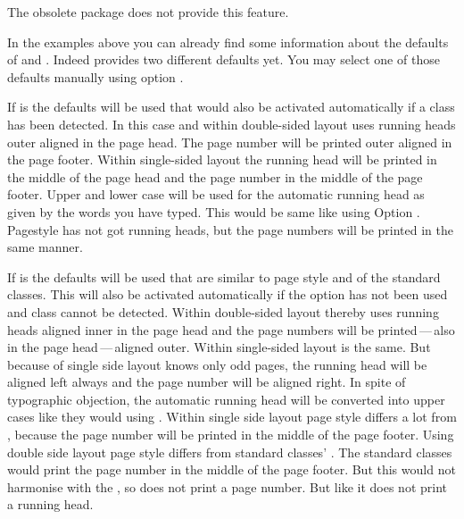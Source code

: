 The obsolete package  does not
provide this feature.%
%
\EndIndexGroup


\begin{Declaration}
\end{Declaration}
%
In the examples above you can already find some information about the defaults
of  and
. Indeed
 provides two different defaults yet. You may select
one of those defaults manually using option .

If  is  the defaults will be used that
would also be activated automatically if a \KOMAScript{} class has been
detected. In this case and within double-sided layout 
uses running heads outer aligned in the page head. The page number will be
printed outer aligned in the page footer. Within single-sided layout the
running head will be printed in the middle of the page head and the page
number in the middle of the page footer. Upper and lower case will be used for
the automatic running head as given by the words you have typed. This would be
same like using Option
. Pagestyle
 has not got running heads, but the page numbers
will be printed in the same manner.

If  is  the defaults will be used that are
similar to page style  and  of the
standard classes. This  will also be activated automatically
if the option has not been used and \KOMAScript{} class cannot be
detected. Within double-sided layout thereby  uses
running heads aligned inner in the page head and the page numbers will be
printed\,---\,also in the page head\,---\,aligned outer. Within single-sided
layout  is the same. But because of single side layout
knows only odd pages, the running head will be aligned left always and the
page number will be aligned right. In spite of typographic objection, the
automatic running head will be converted into upper cases like they would
using . Within
single side layout page style  differs a lot from
, because the page number will be printed in the middle
of the page footer. Using double side layout page style
 differs from standard classes'
. The standard classes would print the page number in the
middle of the page footer. But this would not harmonise with the
, so  does not print a page
number. But like  it does not print a running head.

